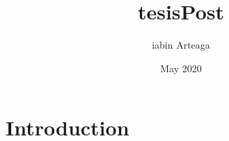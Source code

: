 \documentclass{article}
\title{tesisPost}
\author{iabin Arteaga}
\date{May 2020}
\begin{document}
\maketitle

\section{Introduction}
\end{document}
